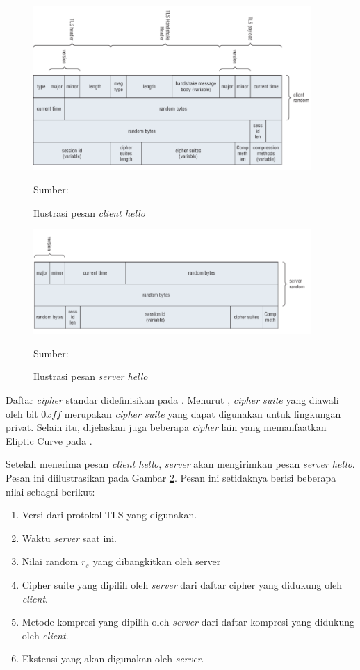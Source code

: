 \begin{figure}[!h]
  \centering
  \includegraphics[width=400px]{chapters/res/chapter-2/img/tls.hello.client.png}
  \caption{Ilustrasi pesan \emph{client hello}} \label{fig:tls.clienthello}
  Sumber: \textcite{joshua2011}
\end{figure}

\begin{figure}[!h]
  \centering
  \includegraphics[width=400px]{chapters/res/chapter-2/img/tls.hello.server.png}
  \caption{Ilustrasi pesan \emph{server hello}} \label{fig:tls.serverhello}
  Sumber: \textcite{joshua2011}
\end{figure}

 Daftar \emph{cipher} standar didefinisikan pada \textcite{rfc5246}. Menurut \textcite{rfc5246}, \emph{cipher suite} yang diawali oleh bit $0xff$ merupakan \emph{cipher suite} yang dapat digunakan untuk lingkungan privat. Selain itu, dijelaskan juga beberapa \emph{cipher} lain yang memanfaatkan Eliptic Curve pada \textcite{rfc4492}. 

Setelah menerima pesan \emph{client hello}, \emph{server} akan mengirimkan pesan \emph{server hello}. Pesan ini diilustrasikan pada Gambar \ref{fig:tls.serverhello}. Pesan ini setidaknya berisi beberapa nilai sebagai berikut:
\begin{enumerate}
  \item Versi dari protokol TLS yang digunakan.
  \item Waktu \emph{server} saat ini.
  \item Nilai random $r_s$ yang dibangkitkan oleh server 
  \item Cipher suite yang dipilih oleh \emph{server} dari daftar cipher yang didukung oleh \emph{client}.
  \item Metode kompresi yang dipilih oleh \emph{server} dari daftar kompresi yang didukung oleh \emph{client}.
  \item Ekstensi yang akan digunakan oleh \emph{server}.
\end{enumerate}

